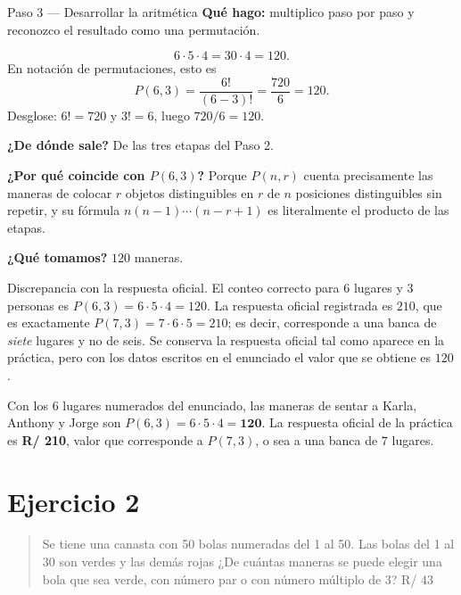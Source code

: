 \documentclass[11pt]{article}
\begin{document}
\begin{paso}{Paso 3 --- Desarrollar la aritmética}
\textbf{Qué hago:} multiplico paso por paso y reconozco el resultado como una permutación.

\[
6\cdot 5\cdot 4 = 30\cdot 4 = 120 .
\]
En notación de permutaciones, esto es
\[
P(6,3)=\frac{6!}{(6-3)!}=\frac{720}{6}=120 .
\]
Desglose: $6!=720$ y $3!=6$, luego $720/6=120$.

\textbf{¿De dónde sale?} De las tres etapas del Paso 2.

\textbf{¿Por qué coincide con $P(6,3)$?} Porque $P(n,r)$ cuenta precisamente las maneras de colocar $r$ objetos distinguibles en $r$ de $n$ posiciones distinguibles sin repetir, y su fórmula $n(n-1)\cdots(n-r+1)$ es literalmente el producto de las etapas.

\textbf{¿Qué tomamos?} $120$ maneras.
\end{paso}

\begin{nota}
Discrepancia con la respuesta oficial. El conteo correcto para $6$ lugares y $3$ personas es $P(6,3)=6\cdot5\cdot4=120$. La respuesta oficial registrada es $210$, que es exactamente $P(7,3)=7\cdot 6\cdot 5=210$; es decir, corresponde a una banca de \emph{siete} lugares y no de seis. Se conserva la respuesta oficial tal como aparece en la práctica, pero con los datos escritos en el enunciado el valor que se obtiene es $120$.
\end{nota}

\begin{resp}
Con los $6$ lugares numerados del enunciado, las maneras de sentar a Karla, Anthony y Jorge son $P(6,3)=6\cdot 5\cdot 4=\mathbf{120}$. La respuesta oficial de la práctica es \textbf{R/ 210}, valor que corresponde a $P(7,3)$, o sea a una banca de $7$ lugares.
\end{resp}

\section*{Ejercicio 2}

\begin{quote}
Se tiene una canasta con 50 bolas numeradas del 1 al 50. Las bolas del 1 al 30 son verdes y las demás rojas ¿De cuántas maneras se puede elegir una bola que sea verde, con número par o con número múltiplo de 3? \hfill R/ 43
\end{quote}
\end{document}
